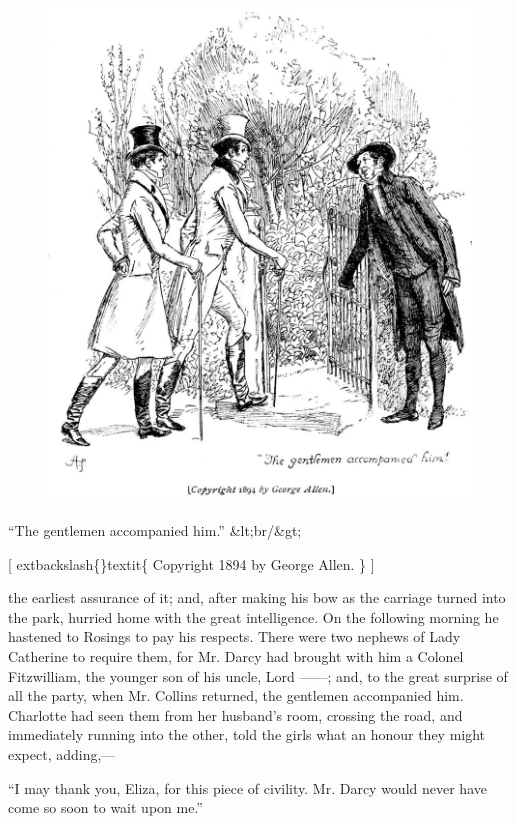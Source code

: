 \documentclass[10pt]{book}
\begin{document}
\begin{figure}[h]
\centering
\includegraphics[width=\linewidth]{images/i_242.jpg}
\end{figure}

     “The gentlemen accompanied him.”
     &lt;br/&gt;

     [
     	extbackslash\{\}textit\{
      Copyright 1894 by George Allen.
     \}
     ]
    

   the earliest assurance of it; and, after making his bow as the carriage
turned into the park, hurried home with the great intelligence. On the
following morning he hastened to Rosings to pay his respects. There were
two nephews of Lady Catherine to require them, for Mr. Darcy had brought
with him a Colonel Fitzwilliam, the younger son of his uncle, Lord ——;
and, to the great surprise of all the party, when Mr. Collins returned,
the gentlemen accompanied him. Charlotte had seen them from her
husband’s room, crossing the road, and
   immediately running into the
other, told the girls what an honour they might expect, adding,—
  

   “I may thank you, Eliza, for this piece of civility. Mr. Darcy would
never have come so soon to wait upon me.”
  
\end{document}
